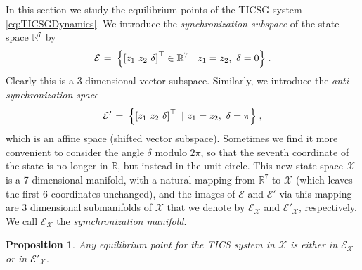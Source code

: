 \documentclass[letterpaper, 10 pt, conference]{ieeeconf}
\newtheorem{proposition}[theorem]{Proposition}
\newcommand{\rline}  {{\mathbb R}}
\newcommand{\m}      {{\hbox{\hskip 1pt}}}
\newcommand{\Emscr}  {{\mathcal{E}}}
\newcommand{\Xmscr}  {{\mathcal{X}}}
\begin{document}
In this section we study the equilibrium points of the TICSG
system \eqref{eq:TICSGDynamics}. We introduce the {\em synchronization 
subspace} of the state space $\rline^7$ by
\begin{equation} \label{eq:SyncSubspace}
   \Emscr \m=\m \left\{ \left[z_1 \ z_2 \ \delta \right]^\top\in
   \rline^7 \ |\ z_1=z_2,\ \delta = 0 \right\} \m.
\end{equation}
Clearly this is a 3-dimensional vector subspace. Similarly, we
introduce the {\em anti-synchronization space}
\begin{equation} \label{eq:AntiSyncSubspace}
   \Emscr' \m=\m \left\{ \left[z_1 \ z_2 \ \delta \right]^\top
   \ |\ z_1=z_2,\ \delta = \pi \right\} \m,
\end{equation}
which is an affine space (shifted vector subspace). Sometimes we find
it more convenient to consider the angle $\delta$ modulo $2\pi$, so
that the seventh coordinate of the state is no longer in $\rline$, but
instead in the unit circle. This new state space $\Xmscr$ is a 7
dimensional manifold, with a natural mapping from $\rline^7$ to
$\Xmscr$ (which leaves the first 6 coordinates unchanged), and the
images of $\Emscr$ and $\Emscr'$ via this mapping are 3 dimensional
submanifolds of $\Xmscr$ that we denote by $\Emscr_\Xmscr$ and
$\Emscr'_\Xmscr$, respectively. We call $\Emscr_\Xmscr$ the 
{\em symchronization manifold}.

\begin{proposition} \label{EqPointsProp1}
Any equilibrium point for the TICS system in $\Xmscr$ is either in
$\Emscr_\Xmscr$ or in $\Emscr'_\Xmscr$.
\end{proposition}
\end{document}
